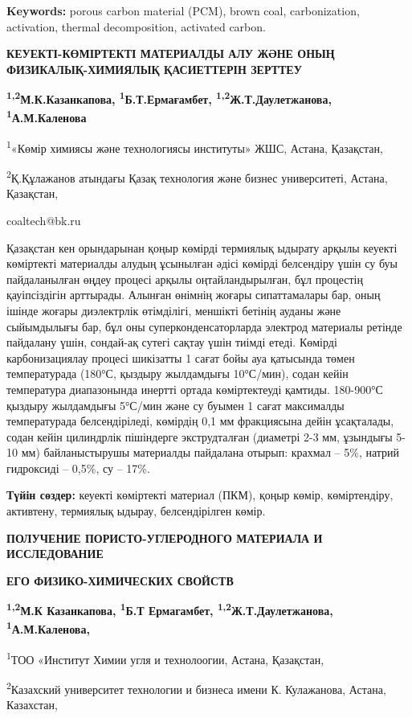 \textbf{Keywords:} porous carbon material (PCM), brown coal,
carbonization, activation, thermal decomposition, activated carbon.

\textbf{КЕУЕКТІ-КӨМІРТЕКТІ МАТЕРИАЛДЫ АЛУ ЖӘНЕ ОНЫҢ ФИЗИКАЛЫҚ-ХИМИЯЛЫҚ
ҚАСИЕТТЕРІН ЗЕРТТЕУ}

\textbf{\textsuperscript{1,2}М.К.Казанкапова,
\textsuperscript{1}Б.Т.Ермағамбет,
\textsuperscript{1,2}Ж.Т.Даулетжанова, \textsuperscript{1}А.М.Каленова}

\textsuperscript{1}«Көмір химиясы және технологиясы институты» ЖШС,
Астана, Қазақстан,

\textsuperscript{2}Қ.Құлажанов атындағы Қазақ технология және бизнес
университеті, Астана, Қазақстан,

coaltech@bk.ru

Қазақстан кен орындарынан қоңыр көмірді термиялық ыдырату арқылы кеуекті
көміртекті материалды алудың ұсынылған әдісі көмірді белсендіру үшін су
буы пайдаланылған өңдеу процесі арқылы оңтайландырылған, бұл процестің
қауіпсіздігін арттырады. Алынған өнімнің жоғары сипаттамалары бар, оның
ішінде жоғары диэлектрлік өтімділігі, меншікті бетінің ауданы және
сыйымдылығы бар, бұл оны суперконденсаторларда электрод материалы
ретінде пайдалану үшін, сондай-ақ сутегі сақтау үшін тиімді етеді.
Көмірді карбонизациялау процесі шикізатты 1 сағат бойы ауа қатысында
төмен температурада (180°С, қыздыру жылдамдығы 10°С/мин), содан кейін
температура диапазонында инертті ортада көміртектеуді қамтиды. 180-900°С
қыздыру жылдамдығы 5°С/мин және су буымен 1 сағат максималды
температурада белсендіріледі, көмірдің 0,1 мм фракциясына дейін
ұсақталады, содан кейін цилиндрлік пішіндерге экструдталған (диаметрі
2-3 мм, ұзындығы 5-10 мм) байланыстырушы материалды пайдалана отырып:
крахмал -- 5\%, натрий гидроксиді -- 0,5\%, су -- 17\%.

\textbf{Түйін сөздер:} кеуекті көміртекті материал (ПКМ), қоңыр көмір,
көміртендіру, активтену, термиялық ыдырау, белсендірілген көмір.

\textbf{ПОЛУЧЕНИЕ ПОРИСТО-УГЛЕРОДНОГО МАТЕРИАЛА И ИССЛЕДОВАНИЕ}

\textbf{ЕГО ФИЗИКО-ХИМИЧЕСКИХ СВОЙСТВ}

\textbf{\textsuperscript{1,2}М.К Казанкапова, \textsuperscript{1}Б.Т
Ермагамбет, \textsuperscript{1,2}Ж.Т.Даулетжанова,
\textsuperscript{1}А.М.Каленова,}

\textsuperscript{1}ТОО «Институт Химии угля и технолоогии, Астана,
Қазақстан,

\textsuperscript{2}Казахский университет технологии и бизнеса имени К.
Кулажанова, Астана, Казахстан,

